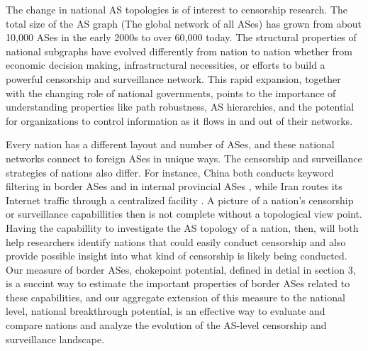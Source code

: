 The change in national AS topologies is of interest to censorship research.
The total size of the AS graph (The global network of all ASes) has grown from about 10,000 ASes in the early 2000s to over 60,000 today. 
The structural properties of national subgraphs have evolved differently
from nation to nation whether from economic decision making, infrastructural necessities, or efforts to build a powerful censorship and surveillance
network.
This rapid expansion, together with the changing role of national
governments, points to the importance of understanding properties like
path robustness, AS hierarchies, and the potential for organizations to
control information as it flows in and out of their networks.


\par Every nation has a different layout and number of ASes, and these national networks
connect to foreign ASes in unique ways. The
censorship and surveillance strategies of nations also differ. For
instance, China both conducts keyword filtering in border ASes and in
internal provincial ASes \cite{chinafiltering}, while Iran routes its
Internet traffic through a centralized facility \cite{irancensor}.
A picture of a nation's censorship or surveillance capabillities then
is not complete without a topological view point.
Having the capabillity to investigate the AS topology of a nation, then, will both help
researchers identify nations that could easily conduct censorship and
also provide possible insight into what kind of censorship is likely
being conducted. Our measure of border ASes, chokepoint potential, defined in detial
in section 3, is a succint way to estimate the important properties of
border ASes related to these capabilities, and our aggregate extension of this measure to
the national level, national breakthrough potential, is an effective way to evaluate and
compare nations and analyze the evolution of the AS-level censorship and surveillance landscape.

